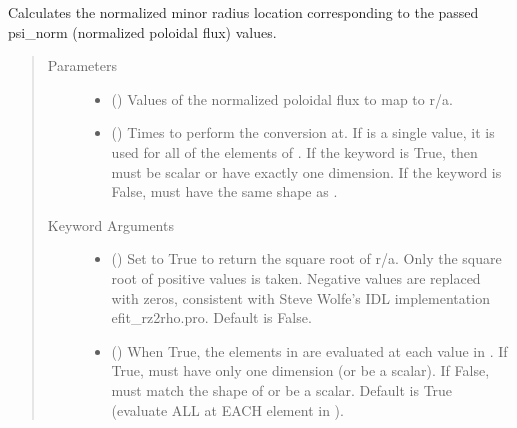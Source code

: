 \documentclass[letterpaper,10pt,english]{sphinxmanual}
\begin{document}
\begin{fulllineitems}
\begin{fulllineitems}
\label{\detokenize{eqtools:eqtools.core.Equilibrium.psinorm2roa}}
Calculates the normalized minor radius location corresponding to the passed psi\_norm (normalized poloidal flux) values.
\begin{quote}\begin{description}
\item[{Parameters}] \leavevmode\begin{itemize}
\item {} 
 () \textendash{} Values of the normalized
poloidal flux to map to r/a.

\item {} 
 () \textendash{} Times to perform the conversion at.
If  is a single value, it is used for all of the elements of
. If the  keyword is True, then  must be scalar
or have exactly one dimension. If the  keyword is False,
 must have the same shape as .

\end{itemize}

\item[{Keyword Arguments}] \leavevmode\begin{itemize}
\item {} 
 () \textendash{} Set to True to return the square root of r/a. Only
the square root of positive values is taken. Negative values are
replaced with zeros, consistent with Steve Wolfe’s IDL
implementation efit\_rz2rho.pro. Default is False.

\item {} 
 () \textendash{} When True, the elements in  are evaluated at
each value in . If True,  must have only one dimension (or
be a scalar). If False,  must match the shape of  or be
a scalar. Default is True (evaluate ALL  at EACH element in
).


\end{itemize}
\end{description}
\end{quote}
\end{fulllineitems}
\end{fulllineitems}
\end{document}
